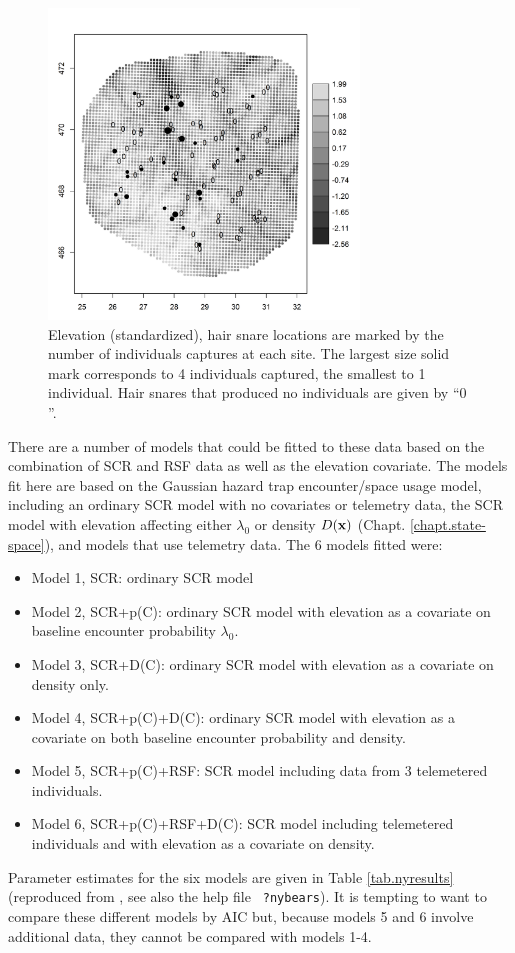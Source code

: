 \begin{figure}[ht]
\centering
\includegraphics[width=3.25in,height=3.25in]{Ch13-RSF/figs/elev_captures_bw.png}
\caption{
Elevation (standardized), hair snare locations are marked by the
number of individuals captures at each site. The largest size solid mark
corresponds to 4 individuals captured, the smallest to 1 individual. 
Hair snares that produced no individuals are given by ``$0$''.
}
\label{fig.elevation}
\end{figure}

There are a number of models that could be fitted to these data based on
the combination of SCR and RSF data as well as the elevation covariate.
The models fit here are
 based on the Gaussian hazard trap encounter/space usage model,
including an ordinary SCR model with no covariates or telemetry data,
the SCR model with elevation affecting either $\lambda_{0}$ or density
$D({\bf x})$ (Chapt. \ref{chapt.state-space}), and models that use
telemetry data.  The 6 models fitted were:
\begin{itemize}
\item[] Model 1, SCR: ordinary SCR model

\item[] Model 2, SCR+p(C): ordinary SCR model with elevation as a
  covariate on baseline encounter probability $\lambda_{0}$.

\item[] Model 3, SCR+D(C): ordinary SCR model with elevation as a
  covariate on density only.

\item[] Model 4, SCR+p(C)+D(C): ordinary SCR model with elevation as
  a covariate on both baseline encounter probability and density.

\item[] Model 5, SCR+p(C)+RSF: SCR model including data from 3
  telemetered individuals.

\item[] Model 6, SCR+p(C)+RSF+D(C): SCR model including telemetered
  individuals and with elevation as a covariate on density.
\end{itemize}
Parameter estimates for the six models are
given in Table \ref{tab.nyresults} (reproduced from
\citet{royle_etal:2012mee}, see also the help file \mbox{\tt
  ?nybears}).
It is tempting to want to compare these different models by AIC but,
because models 5 and 6 involve additional data, they cannot be
compared with models 1-4.


